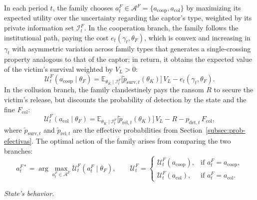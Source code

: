 \documentclass[ecta,nameyear,draft]{econsocart}
\theoremstyle{plain}
\theoremstyle{definition}
\newcommand{\E}{\mathbb{E}}
\newcommand{\1}{\mathbf{1}}
\begin{document}
\noindent In each period $t$, the family chooses $a_t^F\in\mathcal{A}^F=\{a_{\mathrm{coop}},a_{\mathrm{col}}\}$ by maximizing its expected utility over the uncertainty regarding the captor's type, weighted by its private information set $\mathcal{I}_t^F$. In the cooperation branch, the family follows the institutional path, paying the cost $e_t(\gamma_t,\theta_F)$, which is convex and increasing in $\gamma_t$ with asymmetric variation across family types that generates a single-crossing property analogous to that of the captor; in return, it obtains the expected value of the victim's survival weighted by $V_L>0$:
\begin{equation}
\mathcal{U}^F_t(a_{\mathrm{coop}}\mid\theta_F)=\E_{\theta_K\mid\mathcal{I}_t^F}\!\bigl[\tilde{p}_{\mathrm{surv},t}(\theta_K)\bigr]\,V_L-e_t(\gamma_t,\theta_F).
\label{eq:f-coop}
\end{equation}
In the collusion branch, the family clandestinely pays the ransom $R$ to secure the victim's release, but discounts the probability of detection by the state and the fine $F_{\mathrm{col}}$:
\begin{equation}
\mathcal{U}^F_t(a_{\mathrm{col}}\mid\theta_F)=\E_{\theta_K\mid\mathcal{I}_t^F}\!\bigl[\tilde{p}_{\mathrm{rel},t}(\theta_K)\bigr]\,V_L-R-p_{\mathrm{det},t}\,F_{\mathrm{col}},
\label{eq:f-col}
\end{equation}
where $\tilde{p}_{\mathrm{surv},t}$ and $\tilde{p}_{\mathrm{rel},t}$ are the effective probabilities from Section~\ref{subsec:prob-efectivas}. The optimal action of the family arises from comparing the two branches:
\begin{equation}
a_t^{F\ast}=\arg\max_{a_t^F\in\mathcal{A}^F}\mathcal{U}^F_t(a_t^F\mid\theta_F),\qquad
\mathcal{U}^F_t=\begin{cases}\mathcal{U}^F_t(a_{\mathrm{coop}}), & \text{if }a_t^F=a_{\mathrm{coop}},\\\mathcal{U}^F_t(a_{\mathrm{col}}), & \text{if }a_t^F=a_{\mathrm{col}}.\end{cases}
\label{eq:f-argmax}
\end{equation}

\noindent\textit{State's behavior.}
\end{document}
